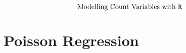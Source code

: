 \documentclass{beamer}
\begin{document}
\begin{frame}
	
	\huge
	\[ \mbox{Modelling Count Variables with \texttt{R} } \]
	\end{frame}



\section{Poisson Regression}




 
\end{document}
